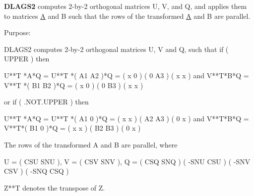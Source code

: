 {\bfseries D\+L\+A\+G\+S2} computes 2-\/by-\/2 orthogonal matrices U, V, and Q, and applies them to matrices \hyperlink{classA}{A} and B such that the rows of the transformed \hyperlink{classA}{A} and B are parallel. 

 \begin{DoxyParagraph}{Purpose\+: }
\begin{DoxyVerb} DLAGS2 computes 2-by-2 orthogonal matrices U, V and Q, such
 that if ( UPPER ) then

           U**T *A*Q = U**T *( A1 A2 )*Q = ( x  0  )
                             ( 0  A3 )     ( x  x  )
 and
           V**T*B*Q = V**T *( B1 B2 )*Q = ( x  0  )
                            ( 0  B3 )     ( x  x  )

 or if ( .NOT.UPPER ) then

           U**T *A*Q = U**T *( A1 0  )*Q = ( x  x  )
                             ( A2 A3 )     ( 0  x  )
 and
           V**T*B*Q = V**T*( B1 0  )*Q = ( x  x  )
                           ( B2 B3 )     ( 0  x  )

 The rows of the transformed A and B are parallel, where

   U = (  CSU  SNU ), V = (  CSV SNV ), Q = (  CSQ   SNQ )
       ( -SNU  CSU )      ( -SNV CSV )      ( -SNQ   CSQ )

 Z**T denotes the transpose of Z.\end{DoxyVerb}
 
\end{DoxyParagraph}

